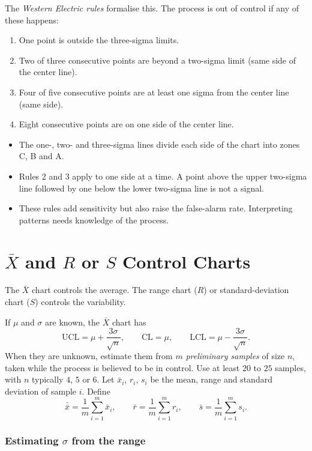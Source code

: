 The \emph{Western Electric rules} formalise this. The process is out of control if any of these happens:
\begin{enumerate}[label=\arabic*.]
  \item One point is outside the three-sigma limits.
  \item Two of three consecutive points are beyond a two-sigma limit (same side of the center line).
  \item Four of five consecutive points are at least one sigma from the center line (same side).
  \item Eight consecutive points are on one side of the center line.
\end{enumerate}
\begin{itemize}
  \item The one-, two- and three-sigma lines divide each side of the chart into zones C, B and A.
  \item Rules 2 and 3 apply to one side at a time. A point above the upper two-sigma line followed by one below the lower two-sigma line is not a signal.
  \item These rules add sensitivity but also raise the false-alarm rate. Interpreting patterns needs knowledge of the process.
\end{itemize}

\section{$\bar{X}$ and $R$ or $S$ Control Charts}

The $\bar{X}$ chart controls the average. The range chart ($R$) or standard-deviation chart ($S$) controls the variability.

If $\mu$ and $\sigma$ are known, the $\bar{X}$ chart has
\[ \mathrm{UCL}=\mu+\frac{3\sigma}{\sqrt n},\qquad\mathrm{CL}=\mu,\qquad\mathrm{LCL}=\mu-\frac{3\sigma}{\sqrt n}. \]
When they are unknown, estimate them from $m$ \emph{preliminary samples} of size $n$, taken while the process is believed to be in control. Use at least $20$ to $25$ samples, with $n$ typically $4$, $5$ or $6$. Let $\bar{x}_i$, $r_i$, $s_i$ be the mean, range and standard deviation of sample $i$. Define
\[ \bar{\bar{x}}=\frac1m\sum_{i=1}^m\bar{x}_i,\qquad\bar{r}=\frac1m\sum_{i=1}^mr_i,\qquad\bar{s}=\frac1m\sum_{i=1}^ms_i. \]

\subsubsection*{Estimating $\sigma$ from the range}

